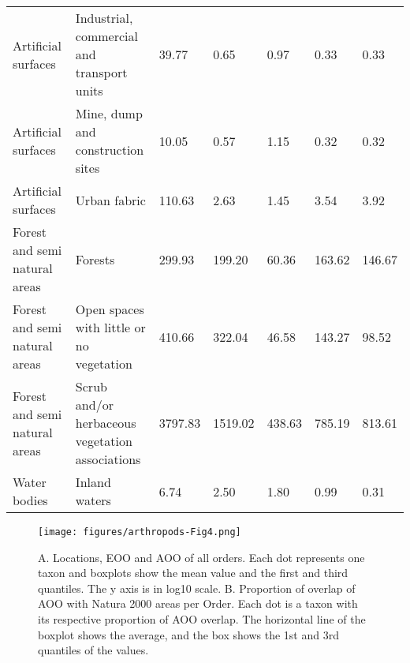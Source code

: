 \begin{table}[]
{\begin{tabular}{lllllll}
Artificial surfaces           & Industrial, commercial and transport units      & 39.77            & 0.65                                                       & 0.97                                                     & 0.33                                                     & 0.33            \\
Artificial surfaces           & Mine, dump and construction sites               & 10.05            & 0.57                                                       & 1.15                                                     & 0.32                                                     & 0.32            \\
Artificial surfaces           & Urban fabric                                    & 110.63           & 2.63                                                       & 1.45                                                     & 3.54                                                     & 3.92            \\
Forest and semi natural areas & Forests                                         & 299.93           & 199.20                                                     & 60.36                                                    & 163.62                                                   & 146.67          \\
Forest and semi natural areas & Open spaces with little or no vegetation        & 410.66           & 322.04                                                     & 46.58                                                    & 143.27                                                   & 98.52           \\
Forest and semi natural areas & Scrub and/or herbaceous vegetation associations & 3797.83          & 1519.02                                                    & 438.63                                                   & 785.19                                                   & 813.61          \\
Water bodies                  & Inland waters                                   & 6.74             & 2.50                                                       & 1.80                                                     & 0.99                                                     & 0.31           
\end{tabular}%
}
\label{table:arthropods-tableS3}
\end{table}

   \begin{figure}[ht]
      \centering
      \texttt{[image: figures/arthropods-Fig4.png]}
      \caption[AOO, EOO and N2K overlaps per order]{A. Locations, EOO and AOO of all orders. Each dot represents one taxon and boxplots show the mean value and the first and third quantiles. The y axis is in log10 scale. B. Proportion of overlap of AOO with Natura 2000 areas per Order. Each dot is a taxon with its respective proportion of AOO overlap. The horizontal line of the boxplot shows the average, and the box shows the 1st and 3rd quantiles of the values.}
      \label{fig:arthropods-fig4}
   \end{figure}

